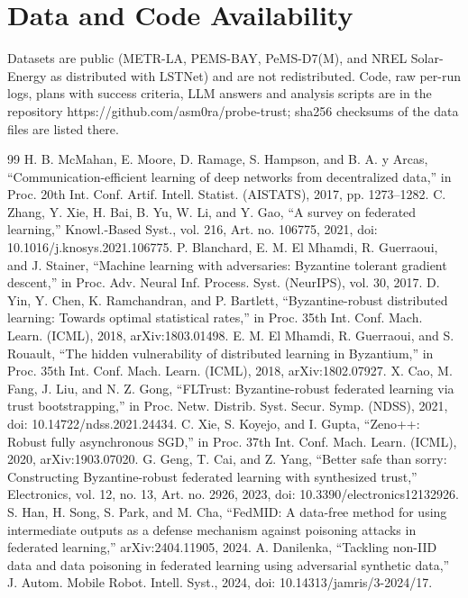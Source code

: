 \documentclass[journal]{IEEEtran}
\begin{document}
\section*{Data and Code Availability}
Datasets are public (METR-LA, PEMS-BAY, PeMS-D7(M), and NREL Solar-Energy as distributed with LSTNet) and are not redistributed. Code, raw per-run logs, plans with success criteria, LLM answers and analysis scripts are in the repository https://github.com/asm0ra/probe-trust; sha256 checksums of the data files are listed there.


\begin{thebibliography}{99}
 H. B. McMahan, E. Moore, D. Ramage, S. Hampson, and B. A. y Arcas, ``Communication-efficient learning of deep networks from decentralized data,'' in Proc. 20th Int. Conf. Artif. Intell. Statist. (AISTATS), 2017, pp. 1273--1282.
 C. Zhang, Y. Xie, H. Bai, B. Yu, W. Li, and Y. Gao, ``A survey on federated learning,'' Knowl.-Based Syst., vol. 216, Art. no. 106775, 2021, doi: 10.1016/j.knosys.2021.106775.
 P. Blanchard, E. M. El Mhamdi, R. Guerraoui, and J. Stainer, ``Machine learning with adversaries: Byzantine tolerant gradient descent,'' in Proc. Adv. Neural Inf. Process. Syst. (NeurIPS), vol. 30, 2017.
 D. Yin, Y. Chen, K. Ramchandran, and P. Bartlett, ``Byzantine-robust distributed learning: Towards optimal statistical rates,'' in Proc. 35th Int. Conf. Mach. Learn. (ICML), 2018, arXiv:1803.01498.
 E. M. El Mhamdi, R. Guerraoui, and S. Rouault, ``The hidden vulnerability of distributed learning in Byzantium,'' in Proc. 35th Int. Conf. Mach. Learn. (ICML), 2018, arXiv:1802.07927.
 X. Cao, M. Fang, J. Liu, and N. Z. Gong, ``FLTrust: Byzantine-robust federated learning via trust bootstrapping,'' in Proc. Netw. Distrib. Syst. Secur. Symp. (NDSS), 2021, doi: 10.14722/ndss.2021.24434.
 C. Xie, S. Koyejo, and I. Gupta, ``Zeno++: Robust fully asynchronous SGD,'' in Proc. 37th Int. Conf. Mach. Learn. (ICML), 2020, arXiv:1903.07020.
 G. Geng, T. Cai, and Z. Yang, ``Better safe than sorry: Constructing Byzantine-robust federated learning with synthesized trust,'' Electronics, vol. 12, no. 13, Art. no. 2926, 2023, doi: 10.3390/electronics12132926.
 S. Han, H. Song, S. Park, and M. Cha, ``FedMID: A data-free method for using intermediate outputs as a defense mechanism against poisoning attacks in federated learning,'' arXiv:2404.11905, 2024.
 A. Danilenka, ``Tackling non-IID data and data poisoning in federated learning using adversarial synthetic data,'' J. Autom. Mobile Robot. Intell. Syst., 2024, doi: 10.14313/jamris/3-2024/17.

\end{thebibliography}
\end{document}
